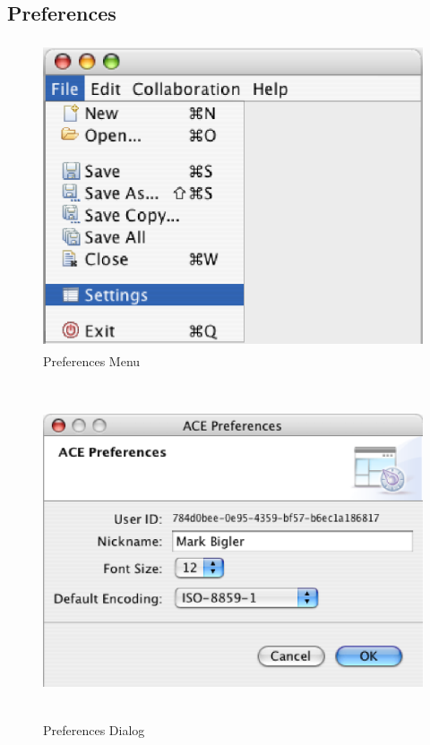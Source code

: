 \documentclass[11pt,a4paper]{article}
\begin{document}
\subsection{Preferences}
\begin{figure}[H]
\begin{center}
  \includegraphics[height=3.56in, width=4.56in]{../images/usermanual/menu_file_preferences.eps}
\caption{Preferences Menu}
\label{default}
\end{center}
\end{figure}

\begin{figure}[H]
\begin{center}
  \includegraphics[height=3.9in, width=5.43in]{../images/usermanual/ace_preferences.eps}
\caption{Preferences Dialog}
\label{default}
\end{center}
\end{figure}
\end{document}
